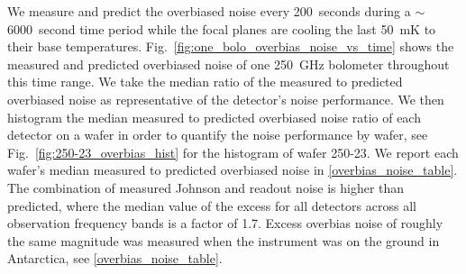 We measure and predict the overbiased noise
every 200~seconds during a $\sim$6000~second time period while the focal planes are cooling the last 50~mK to their base temperatures.
Fig.~\ref{fig:one_bolo_overbias_noise_vs_time} shows the measured and predicted overbiased noise of one 250~GHz bolometer throughout this time range.  
We take the median ratio of the measured to predicted overbiased noise as representative of the detector's noise performance.
We then histogram the median measured to predicted overbiased noise ratio of each detector on a wafer in order to quantify the noise performance by wafer, see Fig.~\ref{fig:250-23_overbias_hist} for the histogram of wafer 250-23. 
We report each wafer's median measured to predicted overbiased noise in \TAB\ref{overbias_noise_table}. 
The combination of measured Johnson and readout noise is higher than predicted, where the median value of the excess for all detectors across all observation frequency bands is a factor of 1.7.  
Excess overbias noise of roughly the same magnitude was measured when the instrument was on the ground in Antarctica, see \TAB\ref{overbias_noise_table}. 

